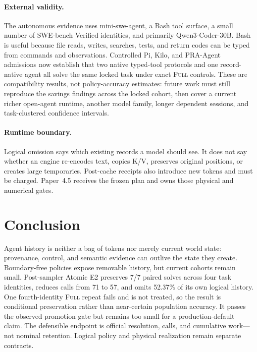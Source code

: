 \documentclass[11pt]{article}
\begin{document}
\paragraph{External validity.}
The autonomous evidence uses mini-swe-agent, a Bash tool surface, a small number
of SWE-bench Verified identities, and primarily Qwen3-Coder-30B.  Bash is useful
because file reads, writes, searches, tests, and return codes can be typed from
commands and observations.  Controlled Pi, Kilo, and PRA-Agent admissions now
establish that two native typed-tool protocols and one record-native agent all
solve the same locked task under exact \textsc{Full} controls.  These are
compatibility results, not policy-accuracy estimates: future work must still
reproduce the savings findings across the locked cohort, then cover a current
richer open-agent runtime, another model family, longer dependent sessions,
and task-clustered confidence intervals.

\paragraph{Runtime boundary.}
Logical omission says which existing records a model should see.  It does not
say whether an engine re-encodes text, copies K/V, preserves original
positions, or creates large temporaries.  Post-cache receipts also introduce
new tokens and must be charged.  Paper~4.5 receives the frozen plan and owns
those physical and numerical gates.

\section{Conclusion}

Agent history is neither a bag of tokens nor merely current world state:
provenance, control, and semantic evidence can outlive the state they create.
Boundary-free policies expose removable history, but current cohorts remain
small.  Post-sampler Atomic E2 preserves 7/7 paired solves across four task
identities, reduces calls from 71 to 57, and omits 52.37\% of its own logical
history.  One fourth-identity \textsc{Full} repeat fails and is not treated,
so the result is conditional preservation rather than near-certain population
accuracy.  It passes the observed promotion gate but remains too small for a
production-default claim.  The defensible endpoint is
official resolution, calls, and cumulative work---not nominal retention.
Logical policy and physical realization remain separate contracts.
\end{document}
